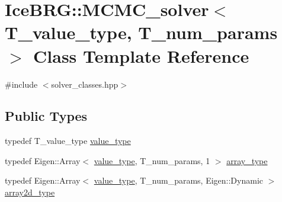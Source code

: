 \hypertarget{classIceBRG_1_1MCMC__solver}{}\section{Ice\+B\+R\+G\+:\+:M\+C\+M\+C\+\_\+solver$<$ T\+\_\+value\+\_\+type, T\+\_\+num\+\_\+params $>$ Class Template Reference}
\label{classIceBRG_1_1MCMC__solver}


{\ttfamily \#include $<$solver\+\_\+classes.\+hpp$>$}

\subsection*{Public Types}
\begin{DoxyCompactItemize}
\item 
typedef T\+\_\+value\+\_\+type \hyperlink{classIceBRG_1_1MCMC__solver_a900afb5655f8fd450d507b642c4a5a8b}{value\+\_\+type}
\item 
typedef Eigen\+::\+Array$<$ \hyperlink{classIceBRG_1_1MCMC__solver_a900afb5655f8fd450d507b642c4a5a8b}{value\+\_\+type}, T\+\_\+num\+\_\+params, 1 $>$ \hyperlink{classIceBRG_1_1MCMC__solver_ad97acf248381de04fa6fc4bdcd3f9a63}{array\+\_\+type}
\item 
typedef Eigen\+::\+Array$<$ \hyperlink{classIceBRG_1_1MCMC__solver_a900afb5655f8fd450d507b642c4a5a8b}{value\+\_\+type}, T\+\_\+num\+\_\+params, Eigen\+::\+Dynamic $>$ \hyperlink{classIceBRG_1_1MCMC__solver_a078c222e71acc977dd50aa67f50a9983}{array2d\+\_\+type}
\end{DoxyCompactItemize}
